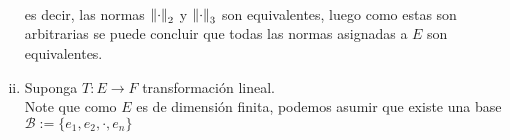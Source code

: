 \begin{homeworkProblem}
\begin{solution}
\begin{enumerate}[(i)]
\begin{align*}
        \end{align*}
        es decir, las normas $\left\|\cdot\right\|_{2}$ y $\left\|\cdot\right\|_{3}$ son equivalentes, luego como estas son arbitrarias se puede concluir que todas las normas asignadas a $E$ son equivalentes.
      \item Suponga $T:E\to F$ transformación lineal.\\
        Note que como $E$ es de dimensión finita, podemos asumir que existe una base $\mathcal{B}:=\{e_1,e_2,\cdot,e_n\}$ 
    \end{enumerate}
  \end{solution}
\end{homeworkProblem}
